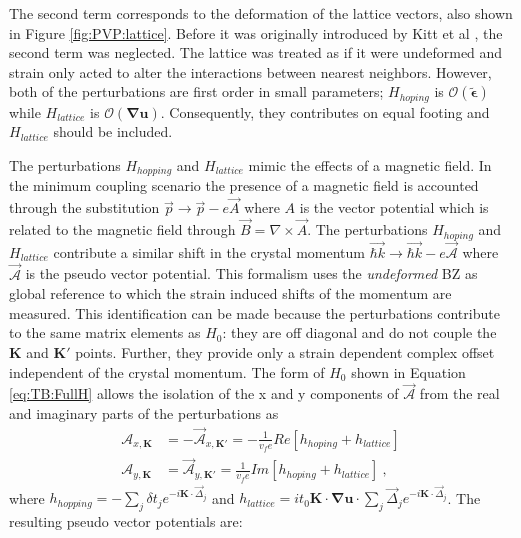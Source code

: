 The second term corresponds to the deformation of the lattice vectors, also shown in Figure \ref{fig:PVP:lattice}.
Before it was originally introduced by Kitt et al \cite{Kitt2012}, the second term was neglected.
The lattice was treated as if it were undeformed and strain only acted to alter the interactions between nearest neighbors.
However, both of the perturbations are first order in small parameters; $H_{hoping}$ is $\mathcal{O}(\tilde{\bm{\epsilon}})$ while $H_{lattice}$ is $\mathcal{O}(\bm{\nabla u})$.
Consequently, they contributes on equal footing and $H_{lattice}$ should be included.

The perturbations $H_{hopping}$ and $H_{lattice}$ mimic the effects of a magnetic field.
In the minimum coupling scenario the presence of a magnetic field is accounted through the substitution $\vec{p} \rightarrow \vec{p} - e \vec{A}$ where $A$ is the vector potential which is related to the magnetic field through $\vec{B}=\nabla \times \vec{A}$.
The perturbations $H_{hoping}$ and $H_{lattice}$ contribute a similar shift in the crystal momentum $\vec{\hbar k} \rightarrow \vec{\hbar k} - e \vec{\mathcal{A}}$ where $\vec{\mathcal{A}}$ is the pseudo vector potential.
This formalism uses the \emph{undeformed} BZ as global reference to which the strain induced shifts of the momentum are measured.
This identification can be made because the perturbations contribute to the same matrix elements as $H_0$: they are off diagonal and do not couple the $\bm{K}$ and $\bm{K'}$ points.
Further, they provide only a strain dependent complex offset independent of the crystal momentum.
The form of $H_0$ shown in Equation \ref{eq:TB:FullH} allows the isolation of the x and y components of $\vec{\mathcal{A}}$ from the real and imaginary parts of the perturbations as
\begin{align*}
  \mathcal{A}_{x,\bm{K}}&=-\vec{\mathcal{A}}_{x,\bm{K'}}=-\frac{1}{v_f e} Re[h_{hoping}+h_{lattice}] \\
  \mathcal{A}_{y,\bm{K}}&=\vec{\mathcal{A}}_{y,\bm{K'}}= \frac{1}{v_f e} Im[h_{hoping}+h_{lattice}] \ ,
\end{align*}
where $h_{hopping}=-\sum_{j} \delta t_j e^{-i \bm{K} \cdot \vec{\Delta}_j}$ and $h_{lattice}=i t_0 \bm{K} \cdot \bm{\nabla u} \cdot \sum_{j} \vec{\Delta}_j e^{-i \bm{K} \cdot \vec{\Delta}_j}$.
The resulting pseudo vector potentials are:
